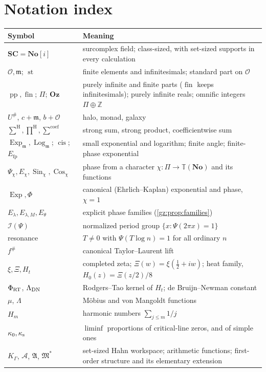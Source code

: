 \documentclass[11pt,a4paper]{article}
\numberwithin{equation}{section}
\theoremstyle{definition}
\theoremstyle{remark}
\newcommand{\No}{\mathbf{No}}
\newcommand{\SC}{\mathbf{SC}}
\newcommand{\Oz}{\mathbf{Oz}}
\newcommand{\Z}{\mathbb Z}
\newcommand{\OO}{\mathcal O}
\newcommand{\mm}{\mathfrak m}
\newcommand{\TT}{\mathbb T}
\newcommand{\st}{\operatorname{st}}
\newcommand{\pp}{\operatorname{pp}}
\newcommand{\fin}{\operatorname{fin}}
\newcommand{\cis}{\operatorname{cis}}
\newcommand{\Exp}{\operatorname{Exp}}
\newcommand{\Ex}{\operatorname{Exp}_{\mm}}
\newcommand{\Lgm}{\operatorname{Log}_{\mm}}
\newcommand{\Efp}{E_{\mathrm{fp}}}
\newcommand{\Sin}{\operatorname{Sin}}
\newcommand{\Cos}{\operatorname{Cos}}
\newcommand{\cI}{\mathcal I}
\newcommand{\Sh}{\mathop{\textstyle\sum}\nolimits^{\mathrm H}}
\newcommand{\Ph}{\mathop{\textstyle\prod}\nolimits^{\mathrm H}}
\newcommand{\Scoef}{\mathop{\textstyle\sum}\nolimits^{\mathrm{coef}}}
\newcommand{\Arith}{\mathcal A}
\begin{document}
\section{Notation index}\label{gz:app:notation}
\begin{center}\small
\begin{longtable}{@{}P{0.22\textwidth}P{0.70\textwidth}@{}}
\toprule
Symbol & Meaning\\
\midrule
\endhead
$\SC=\No[i]$ & surcomplex field; class-sized, with set-sized supports in every calculation\\
$\OO,\mm$; $\st$ & finite elements and infinitesimals; standard part on $\OO$\\
$\pp,\fin$; $\Pi$; $\Oz$ & purely infinite and finite parts ($\fin$ keeps infinitesimals); purely infinite reals; omnific integers $\Pi\oplus\Z$\\
$U^\#$, $c+\mm$, $b+\OO$ & halo, monad, galaxy\\
$\Sh,\Ph,\Scoef$ & strong sum, strong product, coefficientwise sum\\
$\Ex,\Lgm$; $\cis$; $\Efp$ & small exponential and logarithm; finite angle; finite-phase exponential\\
$\Psi_\chi,E_\chi,\Sin_\chi,\Cos_\chi$ & phase from a character $\chi:\Pi\to\TT(\No)$ and its functions\\
$\Exp,\Phi$ & canonical (Ehrlich--Kaplan) exponential and phase, $\chi=1$\\
$E_\lambda,E_{\lambda,M},E_\theta$ & explicit phase families (\cref{gz:prop:families})\\
$\cI(\Psi)$ & normalized period group $\{x:\Psi(2\pi x)=1\}$\\
resonance & $T\ne0$ with $\Psi(T\log n)=1$ for all ordinary $n$\\
$f^\#$ & canonical Taylor--Laurent lift\\
$\xi,\Xi,H_t$ & completed zeta; $\Xi(w)=\xi(\tfrac12+iw)$; heat family, $H_0(z)=\Xi(z/2)/8$\\
$\Phi_{\rm RT}$, $\Lambda_{\rm DN}$ & Rodgers--Tao kernel of $H_t$; de Bruijn--Newman constant\\
$\mu$, $\Lambda$ & M\"obius and von Mangoldt functions\\
$H_m$ & harmonic numbers $\sum_{j\le m}1/j$\\
$\kappa_0,\kappa_{\rm s}$ & $\liminf$ proportions of critical-line zeros, and of simple ones\\
$K_\Gamma$, $\Arith$, $\mathfrak A$, $\mathfrak M^*$ & set-sized Hahn workspace; arithmetic functions; first-order structure and its elementary extension\\

\end{longtable}
\end{center}
\end{document}

